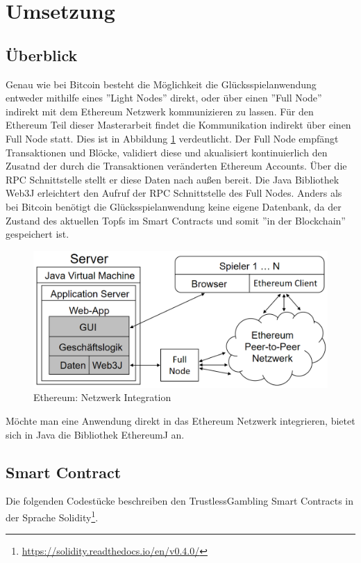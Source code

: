 \section{Umsetzung}
\subsection{Überblick}
Genau wie bei Bitcoin besteht die Möglichkeit die Glücksspielanwendung entweder mithilfe eines ''Light Nodes'' direkt, oder über einen ''Full Node'' indirekt mit dem Ethereum Netzwerk kommunizieren zu lassen. Für den Ethereum Teil dieser Masterarbeit findet die Kommunikation indirekt über einen Full Node statt. Dies ist in Abbildung \ref{fig:eth_anwendung_aufbau} verdeutlicht. Der Full Node empfängt Transaktionen und Blöcke, validiert diese und akualisiert kontinuierlich den Zusatnd der durch die Transaktionen veränderten Ethereum Accounts. Über die RPC Schnittstelle stellt er diese Daten nach außen bereit. Die Java Bibliothek Web3J \cite{web3j} erleichtert den Aufruf der RPC Schnittstelle des Full Nodes. Anders als bei Bitcoin benötigt die Glücksspielanwendung keine eigene Datenbank, da der Zustand des aktuellen Topfs im Smart Contracts und somit ''in der Blockchain'' gespeichert ist.
\begin{figure}[H]
\centering
\includegraphics[width=1\linewidth]{Figures/umsetzung_eth/anwendung_aufbau}
\decoRule
\caption{Ethereum: Netzwerk Integration}
\label{fig:eth_anwendung_aufbau}
\end{figure}

Möchte man eine Anwendung direkt in das Ethereum Netzwerk integrieren, bietet sich in Java die Bibliothek EthereumJ \cite{ethereumj} an. 

\subsection{Smart Contract}
Die folgenden Codestücke beschreiben den TrustlessGambling Smart Contracts in der Sprache Solidity\footnote{\url{https://solidity.readthedocs.io/en/v0.4.0/}}.

